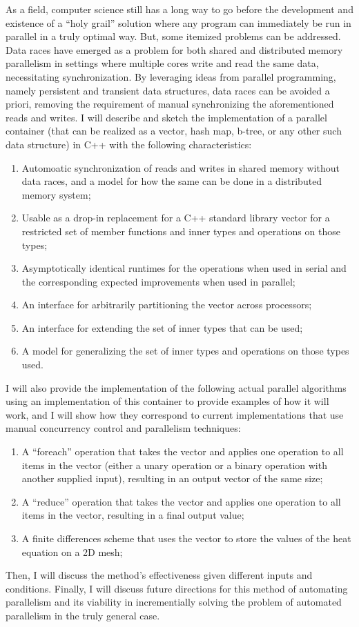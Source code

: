 As a field, computer science still has a long way to go before the development
and existence of a ``holy grail'' solution where any program can immediately be
run in parallel in a truly optimal way. But, some itemized problems can be
addressed. Data races have emerged as a problem for both shared and distributed
memory parallelism in settings where multiple cores write and read the same
data, necessitating synchronization. By leveraging ideas from parallel
programming, namely persistent and transient data structures, data races can be
avoided a priori, removing the requirement of  manual synchronizing the
aforementioned reads and writes. I will describe and sketch the implementation
of a parallel container (that can be realized as a vector, hash map, b-tree, or
any other such data structure) in C++ with the following characteristics:
\begin{enumerate}
    \item Automoatic synchronization of reads and writes in shared memory
        without data races, and a model for how the same can be done in a
        distributed memory system;
    \item Usable as a drop-in replacement for a C++ standard library vector for
        a restricted set of member functions and inner types and operations on
        those types;
    \item Asymptotically identical runtimes for the operations when used in
        serial and the corresponding expected improvements when used in
        parallel;
    \item An interface for arbitrarily partitioning the vector across
        processors;
    \item An interface for extending the set of inner types that can be used;
    \item A model for generalizing the set of inner types and operations on
        those types used.
\end{enumerate}

I will also provide the implementation of the following actual parallel
algorithms using an implementation of this container to provide examples
of how it will work, and I will show how they correspond to current
implementations that use manual concurrency control and parallelism techniques:
\begin{enumerate}
    \item A ``foreach'' operation that takes the vector and applies one
        operation to all items in the vector (either a unary operation or a
        binary operation with another supplied input), resulting in an output
        vector of the same size;
    \item A ``reduce'' operation that takes the vector and applies one operation
        to all items in the vector, resulting in a final output value;
    \item A finite differences scheme that uses the vector to store the values
        of the heat equation on a 2D mesh;
\end{enumerate}

Then, I will discuss the method's effectiveness given different inputs and
conditions. Finally, I will discuss future directions for this method of
automating parallelism and its viability in incrementially solving the problem
of automated parallelism in the truly general case.

